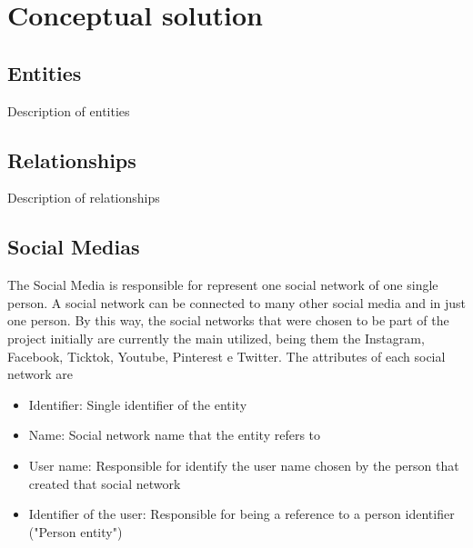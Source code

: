 \chapter{Conceptual solution}




\section{Entities}
Description of entities

\section{Relationships}
Description of relationships

\section{Social Medias}  
    
The Social Media is responsible for represent one social network of one single person. A social network can be connected to many other social media and in just one person. By this way, the social networks that were chosen to be part of the project initially are currently the main utilized, being them the Instagram, Facebook, Ticktok, Youtube, Pinterest e Twitter.
The attributes of each social network are


\begin{itemize}

\item Identifier: Single identifier of the entity

\item Name: Social network name that the entity refers to 

\item User name: Responsible for identify the user name chosen by 
the person that created that social network

\item Identifier of the user: Responsible for being a reference to a person identifier ("Person entity")

\end{itemize}




